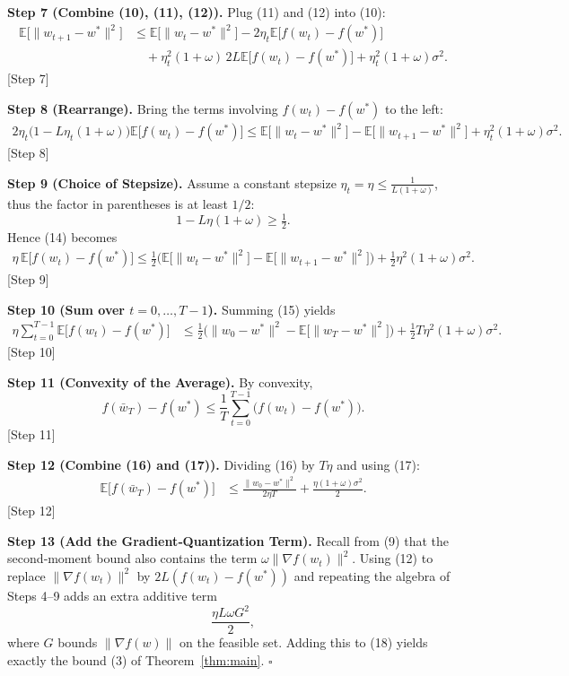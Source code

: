 \documentclass{article}
\newcommand{\E}{\mathbb{E}}
\begin{document}
\noindent\textbf{Step 7 (Combine (10), (11), (12)).}  
Plug (11) and (12) into (10):
\begin{align}
\E\!\big[\|w_{t+1}-w^{*}\|^{2}\big]
&\le \E\!\big[\|w_{t}-w^{*}\|^{2}\big]
-2\eta_t \E\!\big[f(w_t)-f(w^{*})\big] \nonumber\\
&\quad +\eta_t^{2}(1+\omega)\,2L \E\!\big[f(w_t)-f(w^{*})\big]
   +\eta_t^{2}(1+\omega)\sigma^{2}. \tag{13}
\end{align}
[Step 7]

\noindent\textbf{Step 8 (Rearrange).}  
Bring the terms involving $f(w_t)-f(w^{*})$ to the left:
\begin{align}
2\eta_t\Big(1- L\eta_t(1+\omega)\Big)\E\!\big[f(w_t)-f(w^{*})\big]
\le \E\!\big[\|w_{t}-w^{*}\|^{2}\big]
   -\E\!\big[\|w_{t+1}-w^{*}\|^{2}\big]
   +\eta_t^{2}(1+\omega)\sigma^{2}. \tag{14}
\end{align}
[Step 8]

\noindent\textbf{Step 9 (Choice of Stepsize).}  
Assume a constant stepsize $\eta_t=\eta\le\frac{1}{L(1+\omega)}$, thus the factor in parentheses is at least $1/2$:
\[
1- L\eta(1+\omega)\ge \tfrac12 .
\]
Hence (14) becomes
\begin{align}
\eta\,\E\!\big[f(w_t)-f(w^{*})\big]
\le \tfrac12\Big(\E\!\big[\|w_{t}-w^{*}\|^{2}\big]
                -\E\!\big[\|w_{t+1}-w^{*}\|^{2}\big]\Big)
      +\tfrac12\eta^{2}(1+\omega)\sigma^{2}. \tag{15}
\end{align}
[Step 9]

\noindent\textbf{Step 10 (Sum over $t=0,\dots,T-1$).}
Summing (15) yields
\begin{align}
\eta\sum_{t=0}^{T-1}\E\!\big[f(w_t)-f(w^{*})\big]
&\le \tfrac12\Big(\|w_{0}-w^{*}\|^{2}-\E\!\big[\|w_{T}-w^{*}\|^{2}\big]\Big)
   +\tfrac12 T\eta^{2}(1+\omega)\sigma^{2}. \tag{16}
\end{align}
[Step 10]

\noindent\textbf{Step 11 (Convexity of the Average).}
By convexity,
\[
f(\bar w_T)-f(w^{*})\le \frac{1}{T}\sum_{t=0}^{T-1}\big(f(w_t)-f(w^{*})\big).
\tag{17}
\]
[Step 11]

\noindent\textbf{Step 12 (Combine (16) and (17)).}
Dividing (16) by $T\eta$ and using (17):
\begin{align}
\E\!\big[f(\bar w_T)-f(w^{*})\big]
&\le \frac{\|w_{0}-w^{*}\|^{2}}{2\eta T}
   +\frac{\eta(1+\omega)\sigma^{2}}{2}. \tag{18}
\end{align}
[Step 12]

\noindent\textbf{Step 13 (Add the Gradient‑Quantization Term).}  
Recall from (9) that the second‑moment bound also contains the term $\omega\|\nabla f(w_t)\|^{2}$. Using (12) to replace $\|\nabla f(w_t)\|^{2}$ by $2L(f(w_t)-f(w^{*}))$ and repeating the algebra of Steps 4–9 adds an extra additive term 
\[
\frac{\eta L\omega G^{2}}{2},
\]
where $G$ bounds $\|\nabla f(w)\|$ on the feasible set. Adding this to (18) yields exactly the bound (3) of Theorem~\ref{thm:main}. \hfill $\square$
\end{document}
